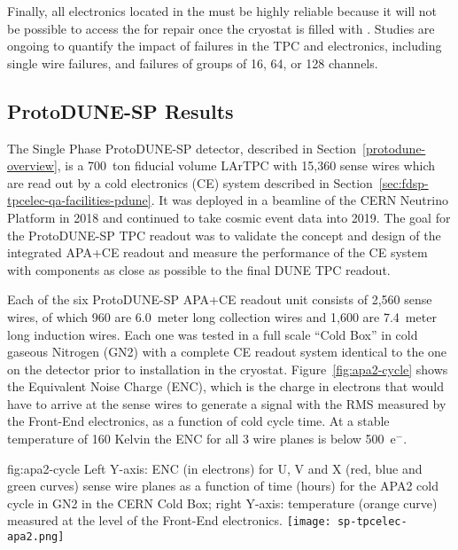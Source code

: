 Finally, all electronics located in the \lar must 
be highly reliable because it will not be possible to access the  for repair once the cryostat is filled with \lar. Studies are ongoing to quantify the impact of failures in the TPC and electronics, including single wire failures, and failures of groups of \num{16}, \num{64}, or \num{128} channels.

\subsection{ProtoDUNE-SP Results}
\label{sec:fdsp-tpcelec-overview-pdune}

The Single Phase ProtoDUNE-SP detector, described in Section~\ref{protodune-overview}, is a 700~ton fiducial volume LArTPC with 15,360 sense wires which are read out by a cold electronics (CE) system described in Section~\ref{sec:fdsp-tpcelec-qa-facilities-pdune}. It was deployed in a beamline of the CERN Neutrino Platform in 2018 and continued to take cosmic event data into 2019. The goal for the ProtoDUNE-SP TPC readout was to validate the concept and design of the integrated APA+CE readout and measure the performance of the CE system with components as close as possible to the final DUNE TPC readout.

Each of the six ProtoDUNE-SP APA+CE readout unit consists of 2,560 sense wires, of which 960 are 6.0~meter long collection wires and 1,600 are 7.4~meter long induction wires. Each one was tested in a full scale ``Cold Box'' in cold gaseous Nitrogen (GN2) with a complete CE readout system identical to the one on the detector prior to installation in the cryostat. Figure~\ref{fig:apa2-cycle} shows the Equivalent Noise Charge (ENC), which is the charge in electrons that would have to arrive at the sense wires to generate a signal with the RMS measured by the Front-End electronics, as a function of cold cycle time. At a stable temperature of 160 Kelvin the ENC for all 3 wire planes is below 500~e$^-$.

\begin{dunefigure}
{fig:apa2-cycle}
{Left Y-axis: ENC (in electrons) for U, V and X (red, blue and green curves) sense wire planes as a function of time (hours) for the APA2 cold cycle in GN2 in the CERN Cold Box; right Y-axis: temperature (orange curve) measured at the level of the Front-End electronics.}
\texttt{[image: sp-tpcelec-apa2.png]}
\end{dunefigure}

